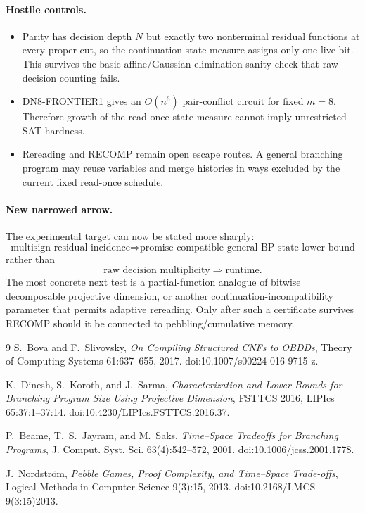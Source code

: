 \paragraph{Hostile controls.}
\begin{itemize}
\item Parity has decision depth \(N\) but exactly two nonterminal residual functions at every
proper cut, so the continuation-state measure assigns only one live bit. This survives the
basic affine/Gaussian-elimination sanity check that raw decision counting fails.
\item DN8-FRONTIER1 gives an \(O(n^6)\) pair-conflict circuit for fixed \(m=8\).
Therefore growth of the read-once state measure cannot imply unrestricted SAT hardness.
\item Rereading and RECOMP remain open escape routes. A general branching program may
reuse variables and merge histories in ways excluded by the current fixed read-once schedule.
\end{itemize}

\paragraph{New narrowed arrow.}
The experimental target can now be stated more sharply:
\[
\boxed{
\text{multisign residual incidence}
\Longrightarrow
\text{promise-compatible general-BP state lower bound}
}
\]
rather than
\[
\text{raw decision multiplicity}\Longrightarrow\text{runtime}.
\]
The most concrete next test is a partial-function analogue of bitwise decomposable
projective dimension, or another continuation-incompatibility parameter that permits
adaptive rereading. Only after such a certificate survives RECOMP should it be connected to
pebbling/cumulative memory.

\begin{thebibliography}{9}
S.~Bova and F.~Slivovsky,
\emph{On Compiling Structured CNFs to OBDDs},
Theory of Computing Systems 61:637--655, 2017.
doi:10.1007/s00224-016-9715-z.

K.~Dinesh, S.~Koroth, and J.~Sarma,
\emph{Characterization and Lower Bounds for Branching Program Size Using Projective Dimension},
FSTTCS 2016, LIPIcs 65:37:1--37:14.
doi:10.4230/LIPIcs.FSTTCS.2016.37.

P.~Beame, T.~S.~Jayram, and M.~Saks,
\emph{Time--Space Tradeoffs for Branching Programs},
J. Comput. Syst. Sci. 63(4):542--572, 2001.
doi:10.1006/jcss.2001.1778.

J.~Nordstr\"om,
\emph{Pebble Games, Proof Complexity, and Time--Space Trade-offs},
Logical Methods in Computer Science 9(3):15, 2013.
doi:10.2168/LMCS-9(3:15)2013.
\end{thebibliography}

